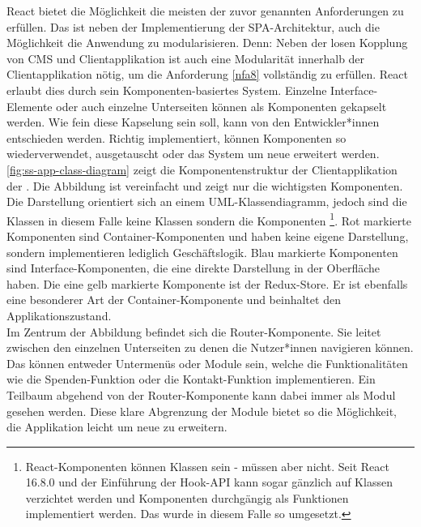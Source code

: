 React bietet die Möglichkeit die meisten der zuvor genannten Anforderungen zu erfüllen. 
Das ist neben der Implementierung der SPA-Architektur, auch die Möglichkeit die 
Anwendung zu modularisieren. Denn: Neben der losen Kopplung von CMS und Clientapplikation
ist auch eine Modularität innerhalb der Clientapplikation nötig, um die Anforderung \ref{nfa8}
vollständig zu erfüllen. React erlaubt dies durch sein Komponenten-basiertes System. Einzelne
Interface-Elemente oder auch einzelne Unterseiten können als Komponenten gekapselt werden.
Wie fein diese Kapselung sein soll, kann von den Entwickler*innen entschieden werden. Richtig implementiert,
können Komponenten so wiederverwendet, ausgetauscht oder das System um neue erweitert werden.\\
\autoref{fig:ss-app-class-diagram} zeigt die Komponentenstruktur der Clientapplikation der \shst{}.
Die Abbildung ist vereinfacht und zeigt nur die wichtigsten Komponenten. Die Darstellung orientiert
sich an einem UML-Klassendiagramm, jedoch sind die Klassen in diesem Falle keine Klassen sondern die
Komponenten 
\footnote{React-Komponenten können Klassen sein - müssen aber nicht. Seit React 16.8.0 und
der Einführung der Hook-API \cite{react-hooks} kann sogar gänzlich auf Klassen verzichtet werden und Komponenten 
durchgängig als Funktionen implementiert werden. Das wurde in diesem Falle so umgesetzt.}. 
Rot markierte Komponenten sind Container-Komponenten und haben keine eigene Darstellung, sondern implementieren 
lediglich Geschäftslogik. Blau markierte Komponenten sind Interface-Komponenten, die eine direkte 
Darstellung in der Oberfläche haben. Die eine gelb markierte Komponente ist der Redux-Store. 
Er ist ebenfalls eine besonderer Art der Container-Komponente und beinhaltet den Applikationszustand.\\
Im Zentrum der Abbildung befindet sich die Router-Komponente. Sie leitet zwischen den einzelnen Unterseiten
zu denen die Nutzer*innen navigieren können. Das können entweder Untermenüs oder Module sein, welche
die Funktionalitäten wie die Spenden-Funktion oder die Kontakt-Funktion implementieren. Ein Teilbaum abgehend 
von der Router-Komponente kann dabei immer als Modul gesehen werden. Diese klare Abgrenzung der Module
bietet so die Möglichkeit, die Applikation leicht um neue zu erweitern.
